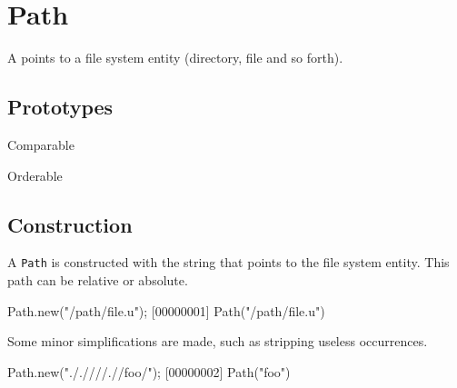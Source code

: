 \section{Path}

A  points to a file system entity (directory, file and so
forth).

\subsection{Prototypes}
\begin{refObjects}
\item[Comparable]
\item[Orderable]
\end{refObjects}

\subsection{Construction}

A \lstinline|Path| is constructed with the string that points to the
file system entity. This path can be relative or absolute.

\begin{urbiscript}[firstnumber=1]
Path.new("/path/file.u");
[00000001] Path("/path/file.u")
\end{urbiscript}

Some minor simplifications are made, such as stripping useless
 occurrences.

\begin{urbiscript}
Path.new("././///.//foo/");
[00000002] Path("foo")
\end{urbiscript}

